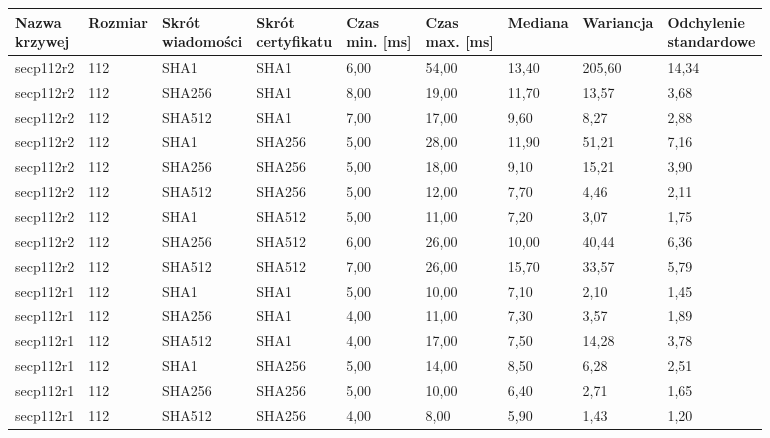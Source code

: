 \begin{longtable}{| l | l | l | l | l |l |l |l |l |}
\hline
\parbox[t]{25mm}{\centering Nazwa\\ krzywej} & \parbox[t]{10mm}{\centering Rozmiar} & \parbox[t]{15mm}{\centering Skrót\\ wiadomości} & \parbox[t]{2cm}{\centering Skrót\\ certyfikatu} &  \parbox[t]{10mm}{\centering Czas\\  min. [ms]} & \parbox[t]{10mm}{\centering Czas\\ max. [ms]}  & \parbox[t]{2cm}{\centering Mediana} & \parbox[t]{2cm}{\centering Wariancja} & \parbox[t]{30mm}{\centering Odchylenie\\ standardowe} \\ \hline 
\endhead
secp112r2 & 112 & SHA1 & SHA1 & 6,00 & 54,00 & 13,40 & 205,60 & 14,34 \\ \hline 
secp112r2 & 112 & SHA256 & SHA1 & 8,00 & 19,00 & 11,70 & 13,57 & 3,68 \\ \hline 
secp112r2 & 112 & SHA512 & SHA1 & 7,00 & 17,00 & 9,60 & 8,27 & 2,88 \\ \hline 
secp112r2 & 112 & SHA1 & SHA256 & 5,00 & 28,00 & 11,90 & 51,21 & 7,16 \\ \hline 
secp112r2 & 112 & SHA256 & SHA256 & 5,00 & 18,00 & 9,10 & 15,21 & 3,90 \\ \hline 
secp112r2 & 112 & SHA512 & SHA256 & 5,00 & 12,00 & 7,70 & 4,46 & 2,11 \\ \hline 
secp112r2 & 112 & SHA1 & SHA512 & 5,00 & 11,00 & 7,20 & 3,07 & 1,75 \\ \hline 
secp112r2 & 112 & SHA256 & SHA512 & 6,00 & 26,00 & 10,00 & 40,44 & 6,36 \\ \hline 
secp112r2 & 112 & SHA512 & SHA512 & 7,00 & 26,00 & 15,70 & 33,57 & 5,79 \\ \hline 
secp112r1 & 112 & SHA1 & SHA1 & 5,00 & 10,00 & 7,10 & 2,10 & 1,45 \\ \hline 
secp112r1 & 112 & SHA256 & SHA1 & 4,00 & 11,00 & 7,30 & 3,57 & 1,89 \\ \hline 
secp112r1 & 112 & SHA512 & SHA1 & 4,00 & 17,00 & 7,50 & 14,28 & 3,78 \\ \hline 
secp112r1 & 112 & SHA1 & SHA256 & 5,00 & 14,00 & 8,50 & 6,28 & 2,51 \\ \hline 
secp112r1 & 112 & SHA256 & SHA256 & 5,00 & 10,00 & 6,40 & 2,71 & 1,65 \\ \hline 
secp112r1 & 112 & SHA512 & SHA256 & 4,00 & 8,00 & 5,90 & 1,43 & 1,20 \\ \hline 

\end{longtable}
